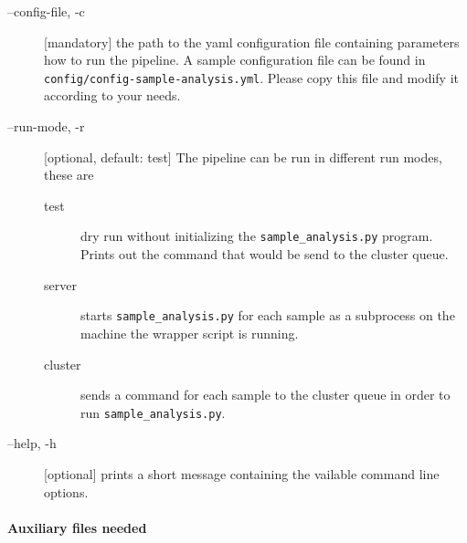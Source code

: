 \documentclass[a4paper]{article}
\begin{document}
\begin{description}
\item[--config-file, -c] [mandatory] the path to the yaml
  configuration file containing parameters how to run the pipeline. A
  sample configuration file can be found in
  \texttt{config/config-sample-analysis.yml}. Please copy this file
  and modify it according to your needs.
\item[--run-mode, -r] [optional, default: test] The pipeline can be
  run in different run modes, these are 

  \begin{description}
  \item[test] dry run without initializing the
    \texttt{sample\_analysis.py} program. Prints out the command
    that would be send to the cluster queue.
  \item[server] starts \texttt{sample\_analysis.py} for each
    sample as a subprocess on the machine the wrapper script is
    running.
  \item[cluster] sends a command for each sample to the cluster queue
    in order to run \texttt{sample\_analysis.py}.
  \end{description}
    
\item[--help, -h] [optional] prints a short message containing the
  vailable command line options.
\end{description}


\paragraph{Auxiliary files needed}
\end{document}

